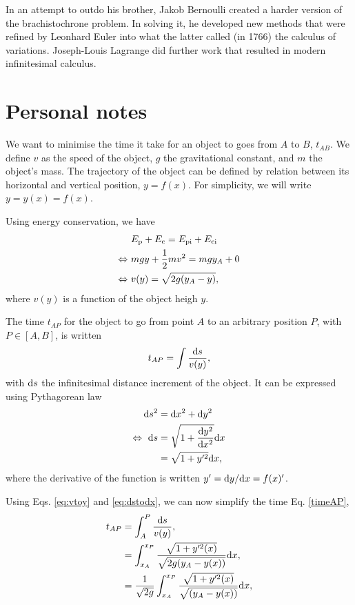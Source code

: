 \documentclass{article}
\begin{document}
In an attempt to outdo his brother, Jakob Bernoulli created a harder version of the brachistochrone problem. In solving it, he developed new methods that were refined by Leonhard Euler into what the latter called (in 1766) the calculus of variations. Joseph-Louis Lagrange did further work that resulted in modern infinitesimal calculus.

\section*{Personal notes}

We want to minimise the time it take for an object to goes from $A$ to $B$, $t_{AB}$. We define $v$ as the speed of the object, $g$ the gravitational constant, and $m$ the object's mass. The trajectory of the object can be defined by relation between its horizontal and vertical position, $y = f(x)$. For simplicity, we will write $y = y(x) = f(x)$.

Using energy conservation, we have
\begin{align}
  &E_{\text p} + E_{\text c} = E_{\text{pi}} + E_{\text{ci}}\nonumber\\
\Leftrightarrow~ & mgy + \frac 12 m v^2 = mgy_A + 0\nonumber\\
\Leftrightarrow~& v(y) = \sqrt{2 g(y_A - y)}, \label{eq:vtoy}
\end{align}
where $v(y)$ is a function of the object heigh $y$.

The time $t_{AP}$ for the object to go from point $A$ to an arbitrary position $P$, with $P\in[A, B]$, is written
\begin{align}
t_{AP} = \int \frac{\text d s }{v(y)}, \label{timeAP}
\end{align}
with $\text d s $ the infinitesimal distance increment of the object. It can be expressed using Pythagorean law
\begin{align}
\text d s^2  &= \text d x^2 + \text d y^2 \nonumber\\
\Leftrightarrow~ \text d s &= \sqrt{1 + \frac{\text d y^2}{\text d x^2}}\text d x\nonumber\\
 & = \sqrt{1 + y'^2}\text d x,\label{eq:dstodx}
\end{align}
where the derivative of the function is written $y' = \text d y/\text d x = f(x)'$.

Using Eqs. \eqref{eq:vtoy} and \eqref{eq:dstodx}, we can now simplify the time Eq. \eqref{timeAP},
\begin{align}
t_{AP} &= \int_A^P \frac{\text d s }{v(y)},\nonumber\\
&= \int_{x_A}^{x_P} \frac{\sqrt{1 + y'^2(x)}}{\sqrt{2 g(y_A - y(x))}} \text d x,\nonumber\\
&= \frac 1{\sqrt{2 g}} \int_{x_A}^{x_P} \frac{\sqrt{1 + y'^2(x)}}{\sqrt{(y_A - y(x))}} \text d x, \label{eq:tAP}
\end{align}
\end{document}
